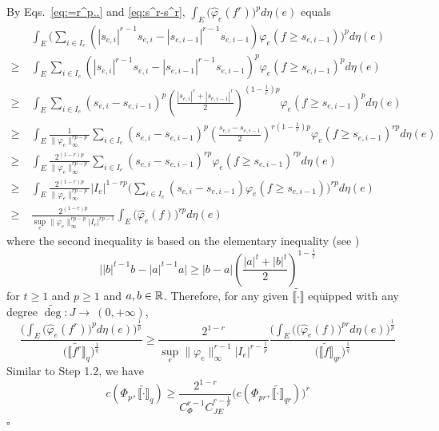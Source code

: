 \documentclass[12pt,a4paper]{article}
\newenvironment{proof}{\medskip\noindent{\bf Proof. }}{\hfill$\square$\medskip}
\begin{document}
\begin{proof}
By Eqs.~\eqref{eq:=r^p..} 
 and \eqref{eq:s^r-s^r}, $\int_E\big(\widehat{\varphi}_e(f^r)\big)^pd\eta(e)$ equals
\begin{align*}
&\int_E\Big(\sum_{i\in I_e} (|s_{e,i}|^{r-1}s_{e,i}-|s_{e,i-1}|^{r-1}s_{e,i-1})\varphi_e(f\ge s_{e,i-1})\Big)^pd\eta(e)
\\ \ge~& \int_E \sum_{i\in I_e} (|s_{e,i}|^{r-1}s_{e,i}-|s_{e,i-1}|^{r-1}s_{e,i-1})^p\varphi_e(f\ge s_{e,i-1}) ^pd\eta(e)
\\ \ge~&\int_E\sum_{i\in I_e} (s_{e,i}-s_{e,i-1})^p\left(\frac{|s_{e,i}|^r+|s_{e,i-1}|^r}{2}\right)^{(1-\frac1r)p}\varphi_e(f\ge s_{e,i-1})^pd\eta(e)
\\ \ge~&\int_E\frac{1}{ \|\varphi_e\|_\infty^{rp-p}}\sum_{i\in I_e} (s_{e,i}-s_{e,i-1})^p\left(\frac{s_{e,i}-s_{e,i-1}}{2}\right)^{r(1-\frac1r)p}\varphi_e(f\ge s_{e,i-1})^{rp}d\eta(e)
\\ \ge~&\int_E\frac{2^{(1-r)p}}{ \|\varphi_e\|_\infty^{rp-p}}\sum_{i\in I_e} (s_{e,i}-s_{e,i-1})^{rp}\varphi_e(f\ge s_{e,i-1})^{rp}d\eta(e)
\\ \ge~&\int_E \frac{2^{(1-r)p}}{ \|\varphi_e\|_\infty^{rp-p}}|I_e|^{1-rp}\Big(\sum_{i\in I_e} (s_{e,i}-s_{e,i-1})\varphi_e(f\ge s_{e,i-1})\Big)^{rp}d\eta(e)
\\ \ge~&\frac{2^{(1-r)p}}{\sup_e\|\varphi_e\|_\infty^{rp-p}|I_e|^{rp-1}}\int_E \big(\widehat{\varphi}_e(f)\big)^{rp}d\eta(e)
\end{align*}
where the second inequality is based on  the elementary inequality (see \cite[Lemma A.1]{Zhang25}) $$\big||b|^{t-1}b-|a|^{t-1}a\big|\ge|b-a|\left(\frac{|a|^t+|b|^t}{2}\right)^{1-\frac1t}$$
for $t\ge 1$ and $p\ge 1$ and $a,b\in\mathbb{R}$. Therefore, for any given $\widetilde{\llbracket \cdot\rrbracket}$ equipped with any degree  $\widetilde{\deg}:J\to\ (0,+\infty)$, 
$$ \frac{\Big(\int_E\big(\widehat{\varphi}_e(f^r)\big)^pd\eta(e)\Big)^{\frac1p}}{\Big(\widetilde{\llbracket f^r\rrbracket}_q
\Big)^{\frac1q} } \ge  \frac{2^{1-r}}{\sup\limits_e\|\varphi_e\|_\infty^{r-1}|I_e|^{r-\frac1p}}\frac{\Big(\int_E\big((\widehat{\varphi}_e(f)\big)^{pr}d\eta(e)\Big)^{\frac1p}}{\Big(\widetilde{\llbracket  f\rrbracket}_{qr}\Big)^{\frac1q}}$$
Similar to Step 1.2, we have%
$$c(\Phi_p,\widetilde{\llbracket \cdot\rrbracket}_{q})\ge  \frac{2^{1-r}}{C_{\Phi}^{r-1}C_{JE}^{r-\frac1p}}\big(c(\Phi_{pr},\widetilde{\llbracket \cdot\rrbracket}_{qr})\big)^r$$ 
\end{proof}
\end{document}
